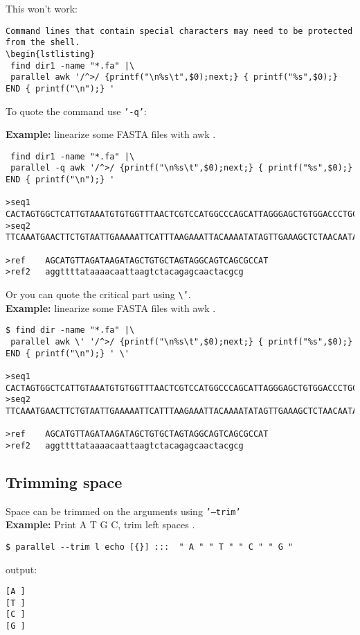 \documentclass{article}
\newcommand{\example}[1]{
\textbf{Example: } {\color[rgb]{0,0,1} #1 } .
}
\begin{document}
This won't work:
\begin{lstlisting}
Command lines that contain special characters may need to be protected from the shell.
\begin{lstlisting}
 find dir1 -name "*.fa" |\
 parallel awk '/^>/ {printf("\n%s\t",$0);next;} { printf("%s",$0);} END { printf("\n");} ' 
\end{lstlisting}
To quote the command use \texttt{'-q'}:

\example{linearize some FASTA files with awk}
\begin{lstlisting}
 find dir1 -name "*.fa" |\
 parallel -q awk '/^>/ {printf("\n%s\t",$0);next;} { printf("%s",$0);} END { printf("\n");} '

>seq1	CACTAGTGGCTCATTGTAAATGTGTGGTTTAACTCGTCCATGGCCCAGCATTAGGGAGCTGTGGACCCTGCAGCCTGGCTGTGGGGGCCGCAGT
>seq2	TTCAAATGAACTTCTGTAATTGAAAAATTCATTTAAGAAATTACAAAATATAGTTGAAAGCTCTAACAATAGACTAAACCAAGCAGAAGAAAGA

>ref	AGCATGTTAGATAAGATAGCTGTGCTAGTAGGCAGTCAGCGCCAT
>ref2	aggttttataaaacaattaagtctacagagcaactacgcg
\end{lstlisting}

Or you can quote the critical part using \texttt{\textbackslash{}'}.\\
\example{linearize some FASTA files with awk}
\begin{lstlisting}
$ find dir -name "*.fa" |\
 parallel awk \' '/^>/ {printf("\n%s\t",$0);next;} { printf("%s",$0);} END { printf("\n");} ' \'

>seq1	CACTAGTGGCTCATTGTAAATGTGTGGTTTAACTCGTCCATGGCCCAGCATTAGGGAGCTGTGGACCCTGCAGCCTGGCTGTGGGGGCCGCAGT
>seq2	TTCAAATGAACTTCTGTAATTGAAAAATTCATTTAAGAAATTACAAAATATAGTTGAAAGCTCTAACAATAGACTAAACCAAGCAGAAGAAAGA

>ref	AGCATGTTAGATAAGATAGCTGTGCTAGTAGGCAGTCAGCGCCAT
>ref2	aggttttataaaacaattaagtctacagagcaactacgcg
\end{lstlisting}


\subsection{Trimming space}
Space can be trimmed on the arguments using  \texttt{'--trim'}\\
\example{Print A T G C, trim left spaces}
\begin{lstlisting}
$ parallel --trim l echo [{}] :::  " A " " T " " C " " G "
\end{lstlisting}
output:
\begin{lstlisting}
[A ]
[T ]
[C ]
[G ]
\end{lstlisting}
\end{document}
